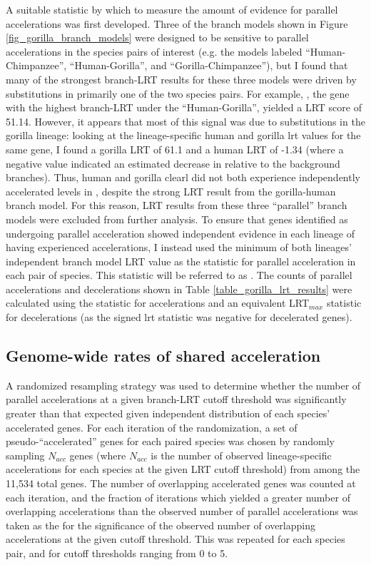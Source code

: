 A suitable statistic by which to measure the amount of evidence for
parallel accelerations was first developed. Three of the branch models
shown in Figure \ref{fig_gorilla_branch_models} were designed to be
sensitive to parallel accelerations in the species pairs of interest
(e.g. the models labeled ``Human-Chimpanzee'', ``Human-Gorilla'', and
``Gorilla-Chimpanzee''), but I found that many of the strongest
branch-LRT results for these three models were driven by \nsyn
substitutions in primarily one of the two species pairs. For example,
, the gene with the highest branch-LRT under the
``Human-Gorilla'', yielded a LRT score of 51.14. However, it appears
that most of this signal was due to substitutions in the gorilla
lineage: looking at the lineage-specific human and gorilla \ac{lrt}
values for the same gene, I found a gorilla LRT of 61.1 and a human
LRT of -1.34 (where a negative value indicated an estimated decrease
in \dnds relative to the background branches). Thus, human and gorilla
clearl did not both experience independently accelerated \dnds levels
in , despite the strong LRT result from the
gorilla-human branch model. For this reason, LRT results from these
three ``parallel'' branch models were excluded from further
analysis. To ensure that genes identified as undergoing parallel
acceleration showed independent evidence in each lineage of having
experienced \dnds accelerations, I instead used the minimum of both
lineages' independent branch model LRT value as the statistic for
parallel acceleration in each pair of species. This statistic will be
referred to as \lrtmin. The counts of parallel accelerations and
decelerations shown in Table \ref{table_gorilla_lrt_results} were
calculated using the \lrtmin statistic for accelerations and an
equivalent LRT$_{max}$ statistic for decelerations (as the signed
\ac{lrt} statistic was negative for decelerated genes).

\subsection{Genome-wide rates of shared acceleration}

A randomized resampling strategy was used to determine whether the
number of parallel accelerations at a given branch-LRT cutoff
threshold was significantly greater than that expected given
independent distribution of each species' accelerated genes. For each
iteration of the randomization, a set of pseudo-``accelerated'' genes
for each paired species was chosen by randomly sampling $N_{acc}$
genes (where $N_{acc}$ is the number of observed lineage-specific
accelerations for each species at the given LRT cutoff threshold) from
among the 11,534 total genes. The number of overlapping accelerated
genes was counted at each iteration, and the fraction of iterations
which yielded a greater number of overlapping accelerations than the
observed number of parallel accelerations was taken as the \pv for the
significance of the observed number of overlapping accelerations at
the given cutoff threshold. This was repeated for each species pair,
and for cutoff thresholds ranging from 0 to 5.


